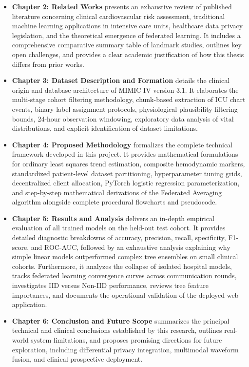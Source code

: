 \begin{itemize}
    \item \textbf{Chapter 2: Related Works} presents an exhaustive review of published literature concerning clinical cardiovascular risk assessment, traditional machine learning applications in intensive care units, healthcare data privacy legislation, and the theoretical emergence of federated learning. It includes a comprehensive comparative summary table of landmark studies, outlines key open challenges, and provides a clear academic justification of how this thesis differs from prior works.
    
    \item \textbf{Chapter 3: Dataset Description and Formation} details the clinical origin and database architecture of MIMIC-IV version 3.1. It elaborates the multi-stage cohort filtering methodology, chunk-based extraction of ICU chart events, binary label assignment protocols, physiological plausibility filtering bounds, 24-hour observation windowing, exploratory data analysis of vital distributions, and explicit identification of dataset limitations.
    
    \item \textbf{Chapter 4: Proposed Methodology} formalizes the complete technical framework developed in this project. It provides mathematical formulations for ordinary least squares trend estimation, composite hemodynamic markers, standardized patient-level dataset partitioning, hyperparameter tuning grids, decentralized client allocation, PyTorch logistic regression parameterization, and step-by-step mathematical derivations of the Federated Averaging algorithm alongside complete procedural flowcharts and pseudocode.
    
    \item \textbf{Chapter 5: Results and Analysis} delivers an in-depth empirical evaluation of all trained models on the held-out test cohort. It provides detailed diagnostic breakdowns of accuracy, precision, recall, specificity, F1-score, and ROC-AUC, followed by an exhaustive analysis explaining why simple linear models outperformed complex tree ensembles on small clinical cohorts. Furthermore, it analyzes the collapse of isolated hospital models, tracks federated learning convergence curves across communication rounds, investigates IID versus Non-IID performance, reviews tree feature importances, and documents the operational validation of the deployed web application.
    
    \item \textbf{Chapter 6: Conclusion and Future Scope} summarizes the principal technical and clinical conclusions established by this research, outlines real-world system limitations, and proposes promising directions for future exploration, including differential privacy integration, multimodal waveform fusion, and clinical prospective deployment.
\end{itemize}
